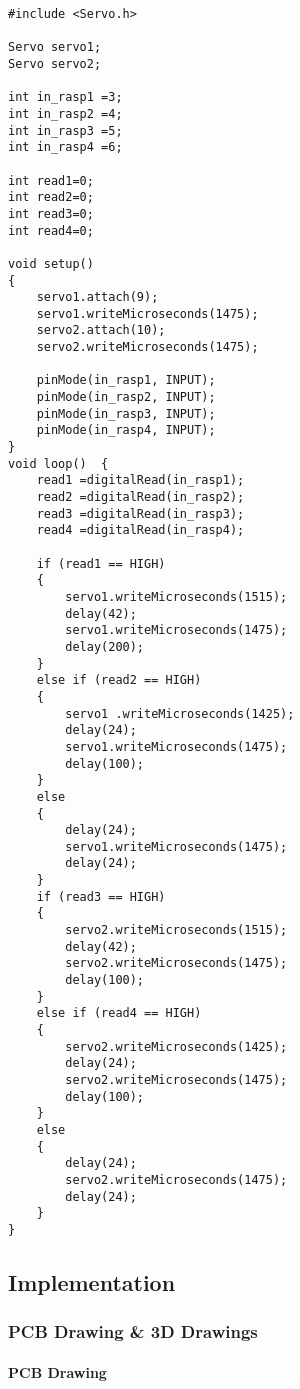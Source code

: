 \begin{lstlisting}[style=CStyle]
#include <Servo.h> 

Servo servo1; 
Servo servo2; 

int in_rasp1 =3; 
int in_rasp2 =4; 
int in_rasp3 =5; 
int in_rasp4 =6; 

int read1=0; 
int read2=0; 
int read3=0; 
int read4=0; 

void setup()  
{ 
    servo1.attach(9); 
    servo1.writeMicroseconds(1475); 
    servo2.attach(10); 
    servo2.writeMicroseconds(1475); 

    pinMode(in_rasp1, INPUT); 
    pinMode(in_rasp2, INPUT); 
    pinMode(in_rasp3, INPUT); 
    pinMode(in_rasp4, INPUT); 
} 
void loop()  {  
    read1 =digitalRead(in_rasp1); 
    read2 =digitalRead(in_rasp2); 
    read3 =digitalRead(in_rasp3); 
    read4 =digitalRead(in_rasp4); 

    if (read1 == HIGH)
    { 
        servo1.writeMicroseconds(1515); 
        delay(42);  
        servo1.writeMicroseconds(1475); 
        delay(200);  
    } 
    else if (read2 == HIGH) 
    { 
        servo1 .writeMicroseconds(1425);
        delay(24); 
        servo1.writeMicroseconds(1475); 
        delay(100);   
    }  
    else  
    {  
        delay(24);  
        servo1.writeMicroseconds(1475);  
        delay(24);  
    }  
    if (read3 == HIGH)  
    {  
        servo2.writeMicroseconds(1515); 
        delay(42); 
        servo2.writeMicroseconds(1475); 
        delay(100);   
    } 
    else if (read4 == HIGH) 
    { 
        servo2.writeMicroseconds(1425);  
        delay(24);  
        servo2.writeMicroseconds(1475); 
        delay(100); 
    } 
    else 
    {  
        delay(24);  
        servo2.writeMicroseconds(1475);  
        delay(24);  
    }   
}
\end{lstlisting}
\subsection{Implementation}



\subsubsection{PCB Drawing \& 3D Drawings}

\paragraph{PCB Drawing}



